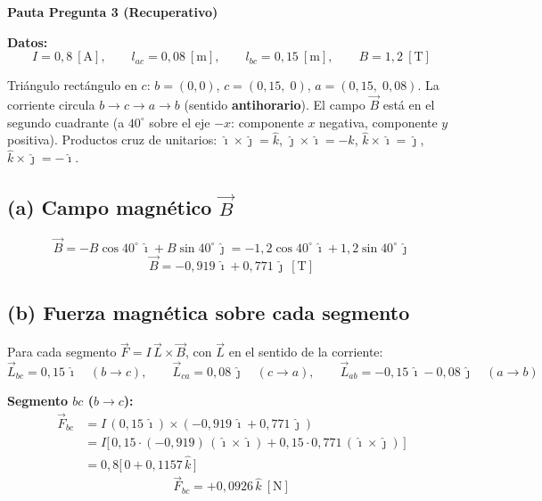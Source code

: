 \documentclass[12pt]{article}
\begin{document}
\begin{center}
    {\Large\textbf{Pauta Pregunta 3 (Recuperativo)}}
\end{center}

\vspace{0.4cm}

\noindent\textbf{Datos:}
\[
    I = 0{,}8\ [\text{A}],\qquad
    l_{ac} = 0{,}08\ [\text{m}],\qquad
    l_{bc} = 0{,}15\ [\text{m}],\qquad
    B = 1{,}2\ [\text{T}]
\]

\noindent Tri\'angulo rect\'angulo en $c$: $b=(0,0)$, $c=(0{,}15,\;0)$, $a=(0{,}15,\;0{,}08)$.
La corriente circula $b\to c\to a\to b$ (sentido \textbf{antihorario}). El campo $\vec{B}$
est\'a en el segundo cuadrante (a $40^\circ$ sobre el eje $-x$: componente $x$ negativa,
componente $y$ positiva). Productos cruz de unitarios:
$\hat{\imath}\times\hat{\jmath}=\hat{k}$,\;
$\hat{\jmath}\times\hat{\imath}=-\hat{k}$,\;
$\hat{k}\times\hat{\imath}=\hat{\jmath}$,\;
$\hat{k}\times\hat{\jmath}=-\hat{\imath}$.

\subsection*{(a) Campo magn\'etico $\vec{B}$}

\[
    \vec{B} = -B\cos40^\circ\,\hat{\imath} + B\sin40^\circ\,\hat{\jmath}
            = -1{,}2\cos40^\circ\,\hat{\imath} + 1{,}2\sin40^\circ\,\hat{\jmath}
\]
\[
    \boxed{\vec{B} = -0{,}919\,\hat{\imath} + 0{,}771\,\hat{\jmath}\ [\text{T}]}
\]

\subsection*{(b) Fuerza magn\'etica sobre cada segmento}

Para cada segmento $\vec{F} = I\,\vec{L}\times\vec{B}$, con $\vec{L}$ en el sentido de la
corriente:
\[
    \vec{L}_{bc} = 0{,}15\,\hat{\imath}
    \quad(b\to c),\qquad
    \vec{L}_{ca} = 0{,}08\,\hat{\jmath}
    \quad(c\to a),\qquad
    \vec{L}_{ab} = -0{,}15\,\hat{\imath} - 0{,}08\,\hat{\jmath}
    \quad(a\to b)
\]

\noindent\textbf{Segmento $bc$ ($b\to c$):}
\begin{align*}
    \vec{F}_{bc} &= I\,(0{,}15\,\hat{\imath})\times(-0{,}919\,\hat{\imath}+0{,}771\,\hat{\jmath}) \\
                 &= I\big[\,0{,}15\cdot(-0{,}919)\,(\hat{\imath}\times\hat{\imath})
                    + 0{,}15\cdot0{,}771\,(\hat{\imath}\times\hat{\jmath})\,\big] \\
                 &= 0{,}8\big[\,0 + 0{,}1157\,\hat{k}\,\big]
\end{align*}
\[
    \boxed{\vec{F}_{bc} = +0{,}0926\,\hat{k}\ [\text{N}]}
\]
\end{document}
